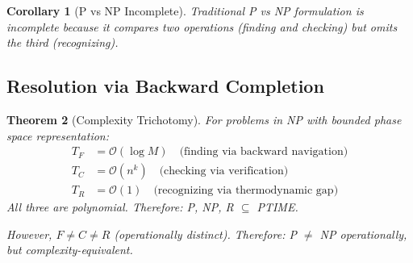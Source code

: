 \documentclass[twocolumn,10pt]{article}
\newtheorem{theorem}{Theorem}[section]
\newtheorem{corollary}[theorem]{Corollary}
\theoremstyle{definition}
\theoremstyle{remark}
\newcommand{\bigO}{\mathcal{O}}
\begin{document}
\begin{corollary}[P vs NP Incomplete]
\label{cor:pnp_incomplete}
Traditional P vs NP formulation is incomplete because it compares two operations (finding and checking) but omits the third (recognizing).
\end{corollary}

\subsection{Resolution via Backward Completion}

\begin{theorem}[Complexity Trichotomy]
\label{thm:pnp_resolution}
For problems in NP with bounded phase space representation:
\begin{align}
T_F &= \bigO(\log M) \quad \text{(finding via backward navigation)} \\
T_C &= \bigO(n^k) \quad \text{(checking via verification)} \\
T_R &= \bigO(1) \quad \text{(recognizing via thermodynamic gap)}
\end{align}
All three are polynomial. Therefore: P, NP, R $\subseteq$ PTIME.

However, $F \neq C \neq R$ (operationally distinct). Therefore: P $\neq$ NP operationally, but complexity-equivalent.
\end{theorem}
\end{document}
